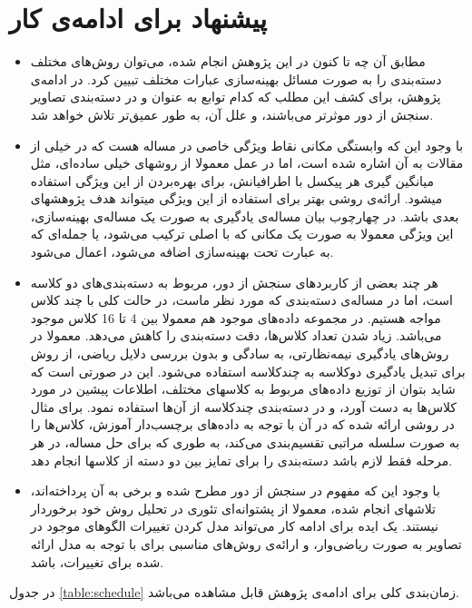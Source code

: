 \documentclass[11pt]{article}
\begin{document}
\section {پیشنهاد برای ادامه‌ی کار}
\begin{itemize}
\item 
مطابق آن چه تا کنون در این پژوهش انجام شده، می‌توان روش‌های مختلف دسته‌بندی را به صورت مسائل بهینه‌سازی عبارات مختلف تبیین کرد. در ادامه‌ی پژوهش، برای کشف این مطلب که کدام توابع به عنوان \lossfunction{} و  در دسته‌بندی تصاویر سنجش از دور موثرتر می‌باشند، و علل آن، به طور عمیق‌تر تلاش خواهد شد.
\item
با وجود این که وابستگی مکانی نقاط ویژگی خاصی در مساله هست که در خیلی از مقالات به آن اشاره شده است، اما در عمل معمولا از روشهای خیلی ساده‌ای، مثل میانگین گیری هر پیکسل با اطرافیانش، برای بهره‌بردن از این ویژگی استفاده میشود. ارائه‌ی روشی بهتر برای استفاده از این ویژگی میتواند هدف پژوهشهای بعدی باشد. در چهارچوب بیان مساله‌ی یادگیری به صورت یک مساله‌ی بهینه‌سازی، این ویژگی معمولا به صورت یک  مکانی که با  اصلی ترکیب می‌شود، یا جمله‌ای که به عبارت تحت بهینه‌سازی اضافه می‌شود، اعمال می‌شود.
\item
هر چند بعضی از کاربرد‌های سنجش از دور، مربوط به دسته‌بندی‌های دو کلاسه است، اما در مساله‌ی دسته‌بندی که مورد نظر ماست، در حالت کلی با چند کلاس مواجه هستیم. در مجموعه داده‌های موجود هم معمولا بین 4 تا 16 کلاس موجود می‌باشد. زیاد شدن تعداد کلاس‌ها، دقت دسته‌بندی را کاهش می‌دهد. معمولا در روش‌های یادگیری نیمه‌نظارتی، به سادگی و بدون بررسی دلایل ریاضی، از روش \oAa{} برای تبدیل یادگیری دوکلاسه به چندکلاسه استفاده می‌شود. این در صورتی است که شاید بتوان از توزیع داده‌های مربوط به کلاسهای مختلف، اطلاعات پیشین در مورد کلاس‌ها به دست آورد، و در دسته‌بندی چندکلاسه از آن‌ها استفاده نمود.  برای مثال در \cite{LapSVM_Knowledge_Transfer_2} روشی ارائه شده که در آن با توجه به داده‌های برچسب‌دار آموزش، کلاس‌ها را به صورت سلسله مراتبی تقسیم‌بندی می‌کند، به طوری که برای حل مساله، در هر مرحله فقط لازم باشد دسته‌بندی را برای تمایز بین دو دسته از کلاسها انجام دهد.
\item
با وجود این که مفهوم \knowledgetransfer{} در سنجش از دور مطرح شده و برخی به آن پرداخته‌اند، تلاشهای انجام شده، معمولا از پشتوانه‌ای تئوری در تحلیل روش خود برخوردار نیستند. یک ایده برای ادامه‌ کار می‌تواند مدل کردن تغییرات الگوهای موجود در تصاویر به صورت ریاضی‌وار، و ارائه‌ی روش‌های مناسبی برای \knowledgetransfer{} با توجه به مدل ارائه شده برای تغییرات، باشد.
\end{itemize}

در جدول \ref{table:schedule} زمان‌بندی کلی برای ادامه‌ی پژوهش قابل مشاهده می‌باشد.
\end{document}
